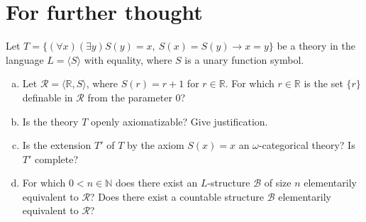 \section*{For further thought}


\begin{problem}

    Let $T=\{(\forall x)(\exists y) S(y)=x,\ S(x)=S(y)\to x=y\}$ be a theory in the language $L=\langle S\rangle$ with equality, where $S$ is a unary function symbol.
    \begin{enumerate}[(a)]
        \item Let $\mathcal{R}=\langle\mathbb{R},S\rangle$, where $S(r)=r+1$ for $r\in\mathbb{R}$. For which $r\in\mathbb{R}$ is the set $\{r\}$ definable in $\mathcal{R}$ from the parameter $0$?
        \item Is the theory $T$ openly axiomatizable? Give justification.
        \item Is the extension $T'$ of $T$ by the axiom $S(x)=x$ an $\omega$-categorical theory? Is $T'$ complete?
        \item For which $0<n\in\mathbb{N}$ does there exist an $L$-structure $\mathcal{B}$ of size $n$ elementarily equivalent to $\mathcal{R}$? Does there exist a countable structure $\mathcal{B}$ elementarily equivalent to $\mathcal{R}$?
    \end{enumerate}

\end{problem}






